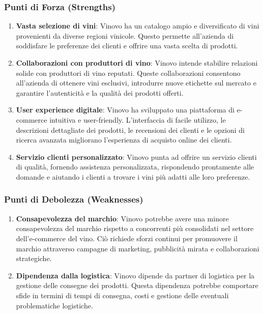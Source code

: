 \documentclass[12pt, a4paper]{article}
\begin{document}
\subsubsection*{Punti di Forza (Strengths)}
\begin{enumerate}
    \item \textbf{Vasta selezione di vini}: Vinovo ha un catalogo ampio e diversificato di vini provenienti da diverse regioni vinicole. Questo permette all'azienda di soddisfare le preferenze dei clienti e offrire una vasta scelta di prodotti.
    \item \textbf{Collaborazioni con produttori di vino}: Vinovo intende stabilire relazioni solide con produttori di vino reputati. Queste collaborazioni consentono all'azienda di ottenere vini esclusivi, introdurre nuove etichette sul mercato e garantire l'autenticità e la qualità dei prodotti offerti.
    \item \textbf{User experience digitale}: Vinovo ha sviluppato una piattaforma di e-commerce intuitiva e user-friendly. L'interfaccia di facile utilizzo, le descrizioni dettagliate dei prodotti, le recensioni dei clienti e le opzioni di ricerca avanzata migliorano l'esperienza di acquisto online dei clienti.
    \item \textbf{Servizio clienti personalizzato}: Vinovo punta ad offrire un servizio clienti di qualità, fornendo assistenza personalizzata, rispondendo prontamente alle domande e aiutando i clienti a trovare i vini più adatti alle loro preferenze.
\end{enumerate}

\subsubsection*{Punti di Debolezza (Weaknesses)}
\begin{enumerate}
    \item \textbf{Consapevolezza del marchio}: Vinovo potrebbe avere una minore consapevolezza del marchio rispetto a concorrenti più consolidati nel settore dell'e-commerce del vino. Ciò richiede sforzi continui per promuovere il marchio attraverso campagne di marketing, pubblicità mirata e collaborazioni strategiche.
    \item \textbf{Dipendenza dalla logistica}: Vinovo dipende da partner di logistica per la gestione delle consegne dei prodotti. Questa dipendenza potrebbe comportare sfide in termini di tempi di consegna, costi e gestione delle eventuali problematiche logistiche.
\end{enumerate}
\end{document}
